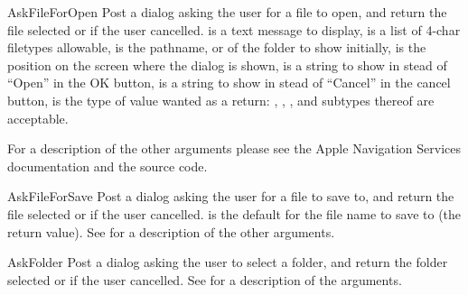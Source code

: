 \begin{funcdesc}{AskFileForOpen}{
	}
Post a dialog asking the user for a file to open, and return the file
selected or  if the user cancelled.
 is a text message to display,
 is a list of 4-char filetypes allowable,
 is the pathname,  or 
of the folder to show initially,
 is the  position on the screen where the
dialog is shown,
 is a string to show in stead of ``Open'' in the
OK button,
 is a string to show in stead of ``Cancel'' in the
cancel button,
 is the type of value wanted as a return: ,
, ,  and subtypes thereof are
acceptable.

For a description of the other arguments please see the Apple Navigation
Services documentation and the  source code.
\end{funcdesc}

\begin{funcdesc}{AskFileForSave}{
	}
Post a dialog asking the user for a file to save to, and return the
file selected or  if the user cancelled.
 is the default for the file name to save to (the
return value). See  for a description of
the other arguments.
\end{funcdesc}

\begin{funcdesc}{AskFolder}{
	}
Post a dialog asking the user to select a folder, and return the
folder selected or  if the user cancelled. See
 for a description of the arguments.
\end{funcdesc}


